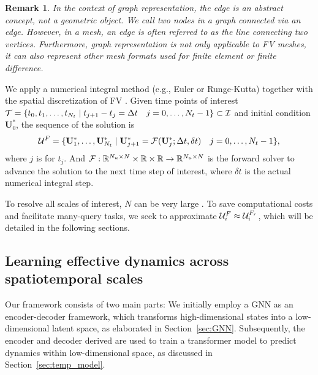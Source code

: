 \documentclass{article}
\newtheorem{remark}{Remark}
\begin{document}
 
 \begin{remark}
 In the context of graph representation, the edge is an abstract concept, not a geometric object. We call two nodes in a graph connected via an edge. However, in a mesh, an edge is often referred to as the line connecting two vertices. Furthermore, graph representation is not only applicable to FV meshes, it can also represent other mesh formats used for finite element or finite difference.
 \end{remark}
 
 We apply a numerical integral method (e.g., Euler or Runge-Kutta) together with the spatial discretization of FV \cite{jasak2007openfoam}. Given time points of interest $\mathcal{T}=\{t_0,t_1,\dots,t_{N_t}\mid t_{j+1}-t_j=\Delta t\quad j=0,\dots,N_t-1\}\subset \mathcal{I}$ and initial condition $\mathbf{U}_{0}^*$, the sequence of the solution is
\begin{equation}
    \mathcal{U}^{F} =  \{\mathbf{U}^*_{1},\dots,\mathbf{U}^*_{N_t}\mid     \mathbf{U}^*_{j+1} = \mathcal{F}(\mathbf{U}^*_{j};\Delta t,\delta t) \quad j=0,\dots,N_t-1 \},
    \label{eqn:solver}
\end{equation}
where $j$ is for $t_j$. And $\mathcal{F}:\mathbb{R}^{N_u\times N}\times \mathbb{R} \times \mathbb{R} \rightarrow \mathbb{R}^{N_u\times N}$ is the forward solver to advance the solution to the next time step of interest, where $\delta t$ is the actual numerical integral step.

To resolve all scales of interest, $N$ can be very large \cite{moukalled2016finite}. To save computational costs and facilitate many-query tasks, we seek to approximate $\mathcal{U}^F_i\approx \mathcal{U}^{F_r}_i$, which will be detailed in the following sections.

\subsection{Learning effective dynamics across spatiotemporal scales}
\label{sec:ledoverview}
Our framework consists of two main parts: We initially employ a GNN as an encoder-decoder framework, which transforms high-dimensional states into a low-dimensional latent space, as elaborated in Section~\ref{sec:GNN}. Subsequently, the encoder and decoder derived are used to train a transformer model to predict dynamics within low-dimensional space, as discussed in Section~\ref{sec:temp_model}.
\end{document}
